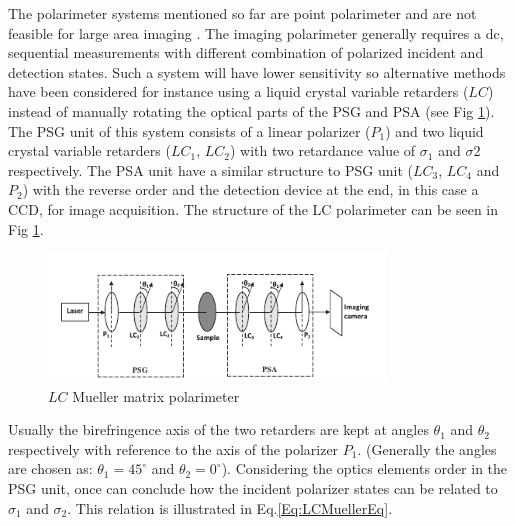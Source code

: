 \documentclass[oneside,a4,12p]{report} %
\begin{document}
The polarimeter systems mentioned so far are point polarimeter and are not feasible for large area imaging \cite{ghosh2011tissue}. The imaging polarimeter generally requires a dc, sequential measurements with different combination of polarized incident and detection states. Such a system will have lower sensitivity so alternative methods have been considered for instance using a liquid crystal variable retarders ($LC$) instead of manually rotating the optical parts of the PSG and PSA \cite{de2004general} (see Fig \ref{fig:LCMueller}).  The PSG unit of this system consists of a linear polarizer ($P_{1}$) and two liquid crystal variable retarders ($LC_{1}$, $LC_{2}$) with two retardance value of $\sigma_{1}$ and $\sigma{2}$ respectively. The PSA unit have a similar structure to PSG unit ($LC_{3}$, $LC_{4}$ and $P_{2}$) with the reverse order and the detection device at the end, in this case a CCD, for image acquisition. The structure of the LC polarimeter can be seen in Fig \ref{fig:LCMueller}.
	\begin{figure}
	\centering 
	\includegraphics[width = 0.8\textwidth]{figures/LCMueller.png}	
	\caption{$LC$ Mueller matrix polarimeter \cite{ghosh2011tissue} }
	\label{fig:LCMueller}
	\end{figure}

Usually the birefringence axis of the two retarders are kept at angles $\theta_{1}$ and $\theta_{2}$ respectively with reference to the axis of the polarizer $P_{1}$. (Generally the angles are chosen as: $\theta_{1} = 45 ^{\circ}$ and $\theta_{2} = 0 ^{\circ}$). Considering the optics elements order in the PSG unit, once can conclude how the incident polarizer states can be related to $\sigma_{1}$ and $\sigma_{2}$. This relation is illustrated in Eq.\ref{Eq:LCMuellerEq}.
\end{document}
